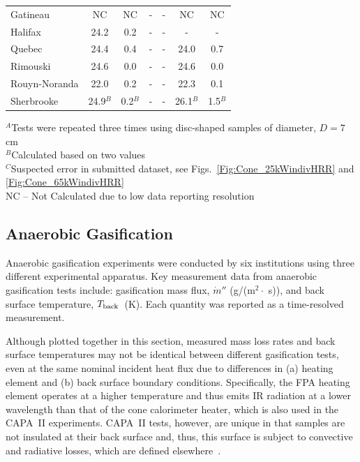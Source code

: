 \documentclass{book}
\begin{document}
\begin{table}[h!]
\begin{center}
\begin{tabular}{|l|cc|cc|cc|}
Gatineau                                & NC       & NC                     & -                     & -                      & NC                    & NC                        \\
Halifax                                 & 24.2     & 0.2                    & -                     & -                      & -                     & -                         \\
Quebec                                  & 24.4     & 0.4                    & -                     & -                      & 24.0                  & 0.7                       \\
Rimouski                                & 24.6     & 0.0                    & -                     & -                      & 24.6                  & 0.0                       \\
Rouyn-Noranda                           & 22.0     & 0.2                    & -                     & -                      & 22.3                  & 0.1                       \\
Sherbrooke                              & 24.9$^B$ & 0.2$^B$                & -                     & -                      & 26.1$^B$              & 1.5$^B$                   \\ \hline
\end{tabular}
\end{center}
$^A$Tests were repeated three times using disc-shaped samples of diameter, $D = 7$ cm \\
$^B$Calculated based on two values \\
$^C$Suspected error in submitted dataset, see Figs.~\ref{Fig:Cone_25kWindivHRR} and \ref{Fig:Cone_65kWindivHRR} \\
NC – Not Calculated due to low data reporting resolution
\end{table}


\newpage
\subsection{Anaerobic Gasification}

Anaerobic gasification experiments were conducted by six institutions using three different experimental apparatus. Key measurement data from anaerobic gasification tests include: gasification mass flux, $\dot{m}''$ (g/(m$^2 \cdot$ s)), and back surface temperature, $T_{\rm back}$~(K). Each quantity was reported as a time-resolved measurement.

Although plotted together in this section, measured mass loss rates and back surface temperatures may not be identical between different gasification tests, even at the same nominal incident heat flux due to differences in (a) heating element and (b) back surface boundary conditions. Specifically, the FPA heating element operates at a higher temperature and thus emits IR radiation at a lower wavelength than that of the cone calorimeter heater, which is also used in the CAPA~II experiments. CAPA~II tests, however, are unique in that samples are not insulated at their back surface and, thus, this surface is subject to convective and radiative losses, which are defined elsewhere~\cite{swann2017controlled}.
\end{document}
